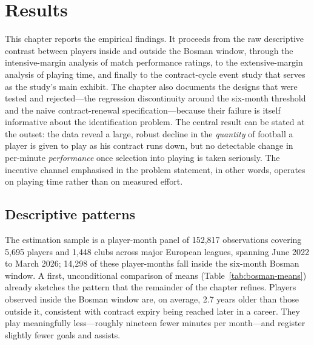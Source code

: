
\section{Results}
\label{sec:results}

This chapter reports the empirical findings. It proceeds from the raw
descriptive contrast between players inside and outside the Bosman window,
through the intensive-margin analysis of match performance ratings, to the
extensive-margin analysis of playing time, and finally to the contract-cycle
event study that serves as the study's main exhibit. The chapter also documents
the designs that were tested and rejected---the regression discontinuity around
the six-month threshold and the naive contract-renewal specification---because
their failure is itself informative about the identification problem. The
central result can be stated at the outset: the data reveal a large, robust
decline in the \emph{quantity} of football a player is given to play as his
contract runs down, but no detectable change in per-minute \emph{performance}
once selection into playing is taken seriously. The incentive channel emphasised
in the problem statement, in other words, operates on playing time rather than
on measured effort.

\subsection{Descriptive patterns}
\label{sec:results-descriptive}

The estimation sample is a player-month panel of 152{,}817 observations
covering 5{,}695 players and 1{,}448 clubs across major European leagues,
spanning June 2022 to March 2026; 14{,}298 of these player-months fall inside
the six-month Bosman window. A first, unconditional comparison of means
(Table~\ref{tab:bosman-means}) already sketches the pattern that the remainder
of the chapter refines. Players observed inside the Bosman window are, on
average, 2.7 years older than those outside it, consistent with contract expiry
being reached later in a career. They play meaningfully less---roughly nineteen
fewer minutes per month---and register slightly fewer goals and assists.

